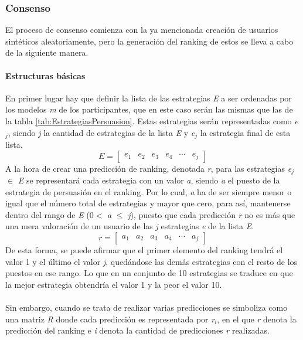 \subsubsection{Consenso}
El proceso de consenso comienza con la ya mencionada creación de usuarios sintéticos aleatoriamente, pero la generación del ranking de estos se lleva a cabo de la siguiente manera.

\paragraph{Estructuras básicas} En primer lugar hay que definir la lista de las estrategias \textit{E} a ser ordenadas por los modelos \textit{m} de los participantes, que en este caso serán las mismas que las de la tabla \ref{tab:EstrategiasPersuasion}. Estas estrategias serán representadas como \textit{e$_{j}$}, siendo \textit{j} la cantidad de estrategias de la lista \textit{E} y \textit{e$_{j}$} la estrategia final de esta lista. 
\[
    \textit{E} = \begin{bmatrix} \textit{e$_{1}$} & \textit{e$_{2}$} & \textit{e$_{3}$} & \textit{e$_{4}$} & \cdots & \textit{e$_{j}$} \end{bmatrix}
\]
A la hora de crear una predicción de ranking, denotada \textit{r}, para las estrategias \textit{e$_j$} $\in$ \textit{E} se representará cada estrategia con un valor \textit{a}, siendo \textit{a} el puesto de la estrategia de persuasión en el ranking. Por lo cual, \textit{a} ha de ser siempre menor o igual que el número total de estrategias y mayor que cero, para así, mantenerse dentro del rango de \textit{E} (0$<$
\textit{a }$\leq$\textit{ j}), puesto que cada predicción \textit{r} no es más que una mera valoración de un usuario de las \textit{j} estrategias \textit{e} de la lista \textit{E}.
\[
    \textit{r} = \begin{bmatrix} \textit{a$_{1}$} & \textit{a$_{2}$} & \textit{a$_{3}$} & \textit{a$_{4}$} & \cdots & \textit{a$_{j}$} \end{bmatrix}
\]
De esta forma, se puede afirmar que el primer elemento del ranking tendrá el valor 1 y el último el valor \textit{j}, quedándose las demás estrategias con el resto de los puestos en ese rango. Lo que en un conjunto de 10 estrategias se traduce en que la mejor estrategia obtendría el valor 1 y la peor el valor 10.
\\ \\
Sin embargo, cuando se trata de realizar varias predicciones se simboliza como una matriz \textit{R} donde cada predicción es representada por \textit{r$_{i}$}, en el que \textit{r} denota la predicción del ranking  e \textit{i} denota la cantidad de predicciones \textit{r} realizadas.

